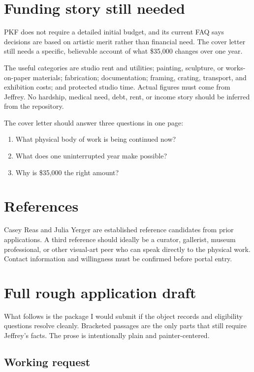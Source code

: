 \documentclass[11pt,letterpaper]{article}
\begin{document}
\section{Funding story still needed}

PKF does not require a detailed initial budget, and its current FAQ says decisions are based on artistic merit rather than financial need. The cover letter still needs a specific, believable account of what \$35,000 changes over one year.

The useful categories are studio rent and utilities; painting, sculpture, or works-on-paper materials; fabrication; documentation; framing, crating, transport, and exhibition costs; and protected studio time. Actual figures must come from Jeffrey. No hardship, medical need, debt, rent, or income story should be inferred from the repository.

The cover letter should answer three questions in one page:

\begin{enumerate}
\item What physical body of work is being continued now?
\item What does one uninterrupted year make possible?
\item Why is \$35,000 the right amount?
\end{enumerate}

\section{References}

Casey Reas and Julia Yerger are established reference candidates from prior applications. A third reference should ideally be a curator, gallerist, museum professional, or other visual-art peer who can speak directly to the physical work. Contact information and willingness must be confirmed before portal entry.

\clearpage
\section{Full rough application draft}

What follows is the package I would submit if the object records and eligibility questions resolve cleanly. Bracketed passages are the only parts that still require Jeffrey's facts. The prose is intentionally plain and painter-centered.

\subsection{Working request}
\end{document}
